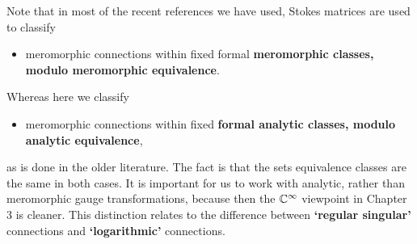 \begin{rem}
  Note that in most of the recent references we have used, Stokes matrices
  are used to classify
  \begin{itemize}
    \item meromorphic connections within fixed formal \textbf{meromorphic
      classes, modulo meromorphic equivalence}.
  \end{itemize}
  Whereas here we classify
  \begin{itemize}
    \item meromorphic connections within fixed \textbf{formal analytic
      classes, modulo analytic equivalence},
  \end{itemize}
  as is done in the older literature.  The fact is that the sets equivalence
  classes are the same in both cases. It is important for us to work with
  analytic, rather than meromorphic gauge transformations, because then the
  $\mathbb{C}^\infty$ viewpoint in Chapter 3 is cleaner. This distinction relates to
  the difference between \textbf{‘regular singular’} connections and
  \textbf{‘logarithmic’} connections.
\end{rem}

